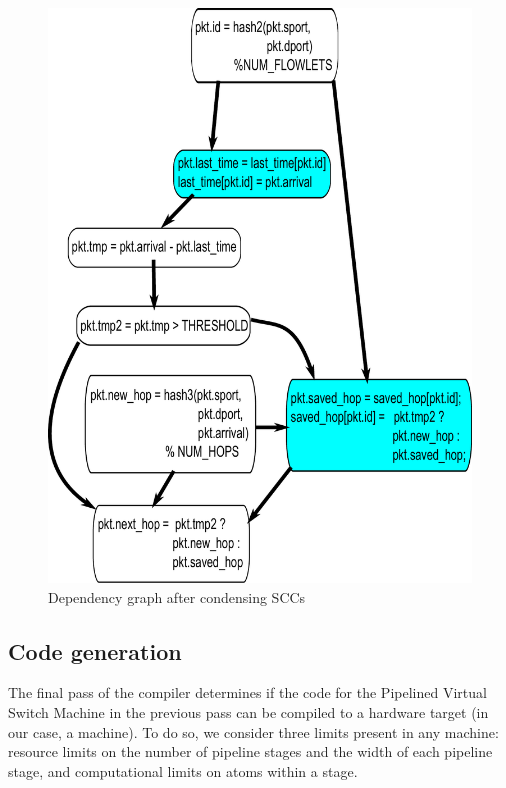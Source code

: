 \begin{figure}[!t]
\begin{minipage}{0.5\textwidth}
\end{minipage}
%
\vrule\quad
%
\begin{minipage}{0.5\textwidth}
\includegraphics[width=\columnwidth]{scc.pdf}
\caption{Dependency graph after condensing SCCs}
\label{fig:partitioning_after}
\end{minipage}
\end{figure}

\subsection{Code generation}
\label{ss:code_gen}
The final pass of the compiler determines if the code for the Pipelined Virtual
Switch Machine in the previous pass can be compiled to a hardware target (in
our case, a \absmachine machine). To do so, we consider three limits present in
any \absmachine machine: resource limits on the number of pipeline stages and
the width of each pipeline stage, and computational limits on atoms within a
stage.

